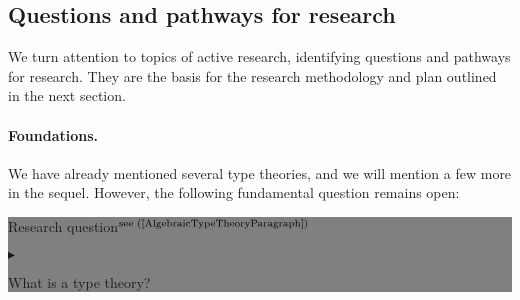 \documentclass[11pt,twocolumn]{article}
\newenvironment{btritemize}
  {\begin{list}{\btr}
  {\setlength{\topsep}{2pt}
   \setlength{\partopsep}{2pt}
   \setlength{\itemsep}{2.5pt}
   \setlength{\parsep}{2.5pt}
   \setlength{\leftmargin}{1em}
   \setlength{\labelwidth}{.5em}}}
  {\end{list}}
\newcommand{\mytextsf}[1]{\textsf{\small #1}}
\newcommand{\hide}[1]{}
\newcommand{\pref}[1]{\,(\ref{#1})}
\newcommand{\btr}{$\blacktriangleright$}
\newcommand{\reqpsize}{8.113395cm}%
\newcommand{\req}[2]{\begin{center}\colorbox{grey}{\begin{minipage}{\reqpsize} 
  \mytextsf{Research question}\hfill$^{\mbox{\scriptsize see #1 }}$\\[-5.5mm]
  \begin{btritemize}
  \item #2
  \end{btritemize}
\end{minipage}}\end{center}}
\begin{document}

\subsection{Questions and pathways for research}

We %
turn attention to topics of active research, identifying questions and
pathways for research.  They are the basis for the research methodology and
plan outlined in the next section.

\setcounter{paragraph}{0}
\paragraph*{Foundations.}

We have already mentioned several type theories, and we will mention a few
more in the sequel.  However, the following fundamental question remains
open:
\req{(\ref{AlgebraicTypeTheoryParagraph})}
{What is a type theory?}

\hide{
Section\pref{AlgebraicTypeTheoryParagraph} aims at a comprehensive
mathematical answer, that will also serve as a framework for our other
type-theoretic developments.  
\hide{
  We regard this as a step towards the related open question:
\req{}{What is a programming language?}
that will be kept in the background of our investigations.
}
}
\end{document}
